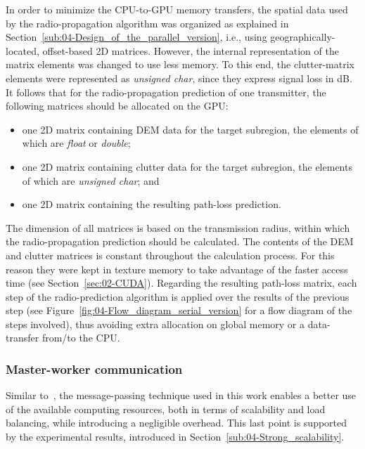 In order to minimize the CPU-to-GPU memory transfers, the spatial
data used by the radio-propagation algorithm was organized as explained
in Section~\ref{sub:04-Design_of_the_parallel_version}, i.e., using
geographically-located, offset-based 2D matrices. However, the internal
representation of the matrix elements was changed to use less memory.
To this end, the clutter-matrix elements were represented as \emph{unsigned
char}, since they express signal loss in dB. It follows that for the
radio-propagation prediction of one transmitter, the following matrices
should be allocated on the GPU:
\begin{itemize}
\item one 2D matrix containing DEM data for the target subregion, the elements
of which are \emph{float} or \emph{double}; 
\item one 2D matrix containing clutter data for the target subregion, the
elements of which are \emph{unsigned char}; and
\item one 2D matrix containing the resulting path-loss prediction.
\end{itemize}
The dimension of all matrices is based on the transmission radius,
within which the radio-propagation prediction should be calculated.
The contents of the DEM and clutter matrices is constant throughout
the calculation process. For this reason they were kept in texture
memory to take advantage of the faster access time (see Section~\ref{sec:02-CUDA}).
Regarding the resulting path-loss matrix, each step of the radio-prediction
algorithm is applied over the results of the previous step (see Figure~\ref{fig:04-Flow_diagram_serial_version}
for a flow diagram of the steps involved), thus avoiding extra allocation
on global memory or a data-transfer from/to the CPU.


\subsubsection{Master-worker communication}

Similar to~\cite{Tabik-High_performance_three_horizon_composition_algorithm_for_large_scale_terrains:2011,Tabik-Optimal_tilt_and_orientation_maps_a_multi_algorithm_approach_for_heterogeneous_multicore_GPU_systems:2013},
the message-passing technique used in this work enables a better use
of the available computing resources, both in terms of scalability
and load balancing, while introducing a negligible overhead. This
last point is supported by the experimental results, introduced in
Section~\ref{sub:04-Strong_scalability}.

